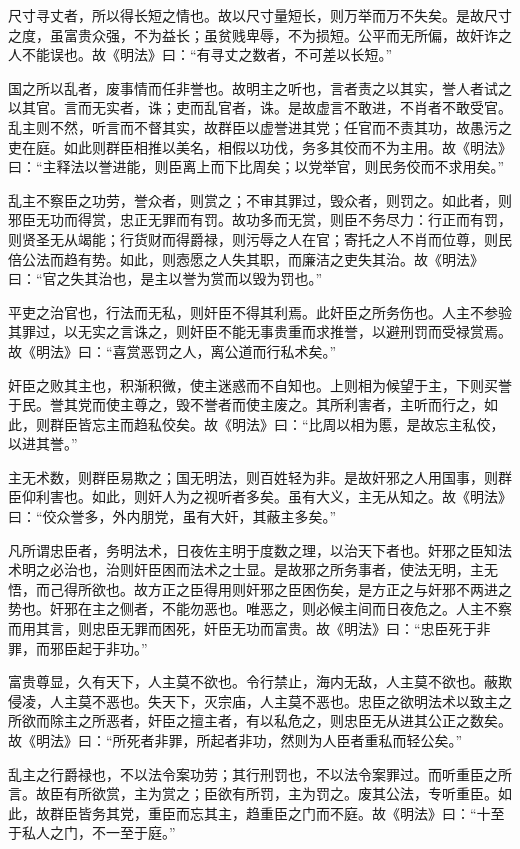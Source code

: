 \documentclass[]{article}
\begin{document}
尺寸寻丈者，所以得长短之情也。故以尺寸量短长，则万举而万不失矣。是故尺寸之度，虽富贵众强，不为益长；虽贫贱卑辱，不为损短。公平而无所偏，故奸诈之人不能误也。故《明法》曰：``有寻丈之数者，不可差以长短。''

国之所以乱者，废事情而任非誉也。故明主之听也，言者责之以其实，誉人者试之以其官。言而无实者，诛；吏而乱官者，诛。是故虚言不敢进，不肖者不敢受官。乱主则不然，听言而不督其实，故群臣以虚誉进其党；任官而不责其功，故愚污之吏在庭。如此则群臣相推以美名，相假以功伐，务多其佼而不为主用。故《明法》曰：``主释法以誉进能，则臣离上而下比周矣；以党举官，则民务佼而不求用矣。''

乱主不察臣之功劳，誉众者，则赏之；不审其罪过，毁众者，则罚之。如此者，则邪臣无功而得赏，忠正无罪而有罚。故功多而无赏，则臣不务尽力：行正而有罚，则贤圣无从竭能；行货财而得爵禄，则污辱之人在官；寄托之人不肖而位尊，则民倍公法而趋有势。如此，则悫愿之人失其职，而廉洁之吏失其治。故《明法》曰：``官之失其治也，是主以誉为赏而以毁为罚也。''

平吏之治官也，行法而无私，则奸臣不得其利焉。此奸臣之所务伤也。人主不参验其罪过，以无实之言诛之，则奸臣不能无事贵重而求推誉，以避刑罚而受禄赏焉。故《明法》曰：``喜赏恶罚之人，离公道而行私术矣。''

奸臣之败其主也，积渐积微，使主迷惑而不自知也。上则相为候望于主，下则买誉于民。誉其党而使主尊之，毁不誉者而使主废之。其所利害者，主听而行之，如此，则群臣皆忘主而趋私佼矣。故《明法》曰：``比周以相为慝，是故忘主私佼，以进其誉。''

主无术数，则群臣易欺之；国无明法，则百姓轻为非。是故奸邪之人用国事，则群臣仰利害也。如此，则奸人为之视听者多矣。虽有大义，主无从知之。故《明法》曰：``佼众誉多，外内朋党，虽有大奸，其蔽主多矣。''

凡所谓忠臣者，务明法术，日夜佐主明于度数之理，以治天下者也。奸邪之臣知法术明之必治也，治则奸臣困而法术之士显。是故邪之所务事者，使法无明，主无悟，而己得所欲也。故方正之臣得用则奸邪之臣困伤矣，是方正之与奸邪不两进之势也。奸邪在主之侧者，不能勿恶也。唯恶之，则必候主间而日夜危之。人主不察而用其言，则忠臣无罪而困死，奸臣无功而富贵。故《明法》曰：``忠臣死于非罪，而邪臣起于非功。''

富贵尊显，久有天下，人主莫不欲也。令行禁止，海内无敌，人主莫不欲也。蔽欺侵凌，人主莫不恶也。失天下，灭宗庙，人主莫不恶也。忠臣之欲明法术以致主之所欲而除主之所恶者，奸臣之擅主者，有以私危之，则忠臣无从进其公正之数矣。故《明法》曰：``所死者非罪，所起者非功，然则为人臣者重私而轻公矣。''

乱主之行爵禄也，不以法令案功劳；其行刑罚也，不以法令案罪过。而听重臣之所言。故臣有所欲赏，主为赏之；臣欲有所罚，主为罚之。废其公法，专听重臣。如此，故群臣皆务其党，重臣而忘其主，趋重臣之门而不庭。故《明法》曰：``十至于私人之门，不一至于庭。''
\end{document}
